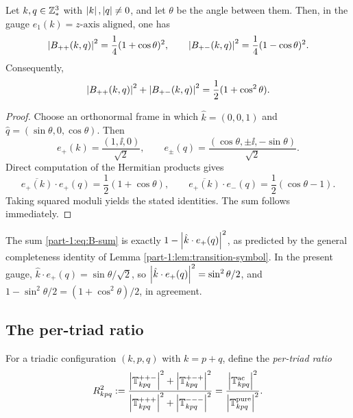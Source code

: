 \begin{lemma}\label{part-1:lem:B-explicit}
Let $k,q\in\mathbb{Z}^3_\ast$ with $\left\lvert k \right\rvert,\left\lvert q \right\rvert\neq 0$, and let 
$\theta$ be the angle between them. Then, in the gauge 
$e_1(k) = z\text{-axis aligned}$, one has
\begin{equation}\label{part-1:eq:B-explicit}
\left\lvert B_{++}(k,q) \right\rvert^2 = \frac{1}{4}(1+\cos\theta)^2,
\qquad
\left\lvert B_{+-}(k,q) \right\rvert^2 = \frac{1}{4}(1-\cos\theta)^2.
\end{equation}
Consequently,
\begin{equation}\label{part-1:eq:B-sum}
\left\lvert B_{++}(k,q) \right\rvert^2 + \left\lvert B_{+-}(k,q) \right\rvert^2 
= \frac{1}{2}(1 + \cos^2\theta).
\end{equation}
\end{lemma}

\begin{proof}
Choose an orthonormal frame in which 
$\hat k = (0,0,1)$ and 
$\hat q = (\sin\theta, 0, \cos\theta)$. Then
\begin{equation*}
e_+(k) = \frac{(1,\ii,0)}{\sqrt 2},
\qquad
e_\pm(q) = \frac{(\cos\theta, \pm\ii, -\sin\theta)}{\sqrt 2}.
\end{equation*}
Direct computation of the Hermitian products gives
\begin{equation*}
\overline{e_+(k)}\cdot e_+(q) = \frac{1}{2}(1+\cos\theta),
\qquad
\overline{e_+(k)}\cdot e_-(q) = \frac{1}{2}(\cos\theta-1).
\end{equation*}
Taking squared moduli yields the stated identities. The sum follows 
immediately.
\end{proof}

\begin{remark}\label{part-1:rem:complete}
The sum \eqref{part-1:eq:B-sum} is exactly 
$1 - \left\lvert \hat k\cdot e_+(q) \right\rvert^2$, as predicted by the general 
completeness identity of Lemma \ref{part-1:lem:transition-symbol}. In the 
present gauge, $\hat k\cdot e_+(q) = \sin\theta/\sqrt 2$, so 
$\left\lvert \hat k\cdot e_+(q) \right\rvert^2 = \sin^2\theta/2$, and 
$1 - \sin^2\theta/2 = (1+\cos^2\theta)/2$, in agreement.
\end{remark}

\subsection{The per-triad ratio}
\label{part-1:ssec:ratio}

\begin{definition}\label{part-1:def:ratio}
For a triadic configuration $(k,p,q)$ with $k = p+q$, define the 
\emph{per-triad ratio}
\begin{equation}\label{part-1:eq:ratio-def}
R_{kpq}^2 
:= \frac{\left\lvert \mathbb{T}^{++-}_{kpq} \right\rvert^2 + \left\lvert \mathbb{T}^{+-+}_{kpq} \right\rvert^2}
        {\left\lvert \mathbb{T}^{+++}_{kpq} \right\rvert^2 + \left\lvert \mathbb{T}^{---}_{kpq} \right\rvert^2}
= \frac{\left\lvert \mathbb{T}^{\mathrm{ac}}_{kpq} \right\rvert^2}{\left\lvert \mathbb{T}^{\mathrm{pure}}_{kpq} \right\rvert^2}.
\end{equation}
\end{definition}

